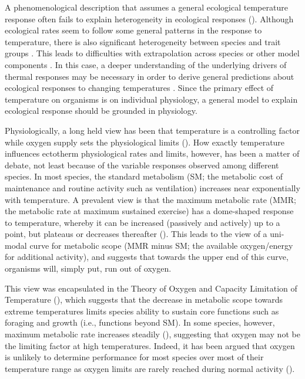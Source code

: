 \documentclass[11pt]{article}\usepackage[]{graphicx}\usepackage[]{color,soul}
\begin{document}
A phenomenological description that assumes a general ecological temperature response often fails to explain heterogeneity in ecological responses (\citealt{angilletta_temperature_2004,rall_universal_2012}). Although ecological rates seem to follow some general patterns in the response to temperature, there is also significant heterogeneity between species and trait groups \cite[e.g., ][]{angilletta_temperature_2004,englund_temperature_2011,rall_universal_2012}. This leads to difficulties with extrapolation across species or other model components \cite[e.g., fish in marine ecosystem models; ][]{guiet_effects_2016}. In this case, a deeper understanding of the underlying drivers of thermal responses may be necessary in order to derive general predictions about ecological responses to changing temperatures \cite[e.g., ][]{vucic-pestic_warming_2011,lefevre_models_2017}. Since the primary effect of temperature on organisms is on individual physiology, a general model to explain ecological response should be grounded in physiology.

Physiologically, a long held view has been that temperature is a controlling factor while oxygen supply sets the physiological limits (\citealt{fry_effects_1947,claireaux_linking_2007,lefevre_are_2016}). How exactly temperature influences ectotherm physiological rates and limits, however, has been a matter of debate, not least because of the variable responses observed among different species. In most species, the standard metabolism (SM; the metabolic cost of maintenance and routine activity such as ventilation) increases near exponentially with temperature. A prevalent view is that the maximum metabolic rate (MMR; the metabolic rate at maximum sustained exercise) has a dome-shaped response to temperature, whereby it can be increased (passively and actively) up to a point, but plateaus or decreases thereafter (\citealt{fry_effects_1947,claireaux_linking_2007,lefevre_are_2016,portner_physiology_2008}). This leads to the view of a uni-modal curve for metabolic scope (MMR minus SM; the available oxygen/energy for additional activity), and suggests that towards the upper end of this curve, organisms will, simply put, run out of oxygen. 

This view was encapsulated in the Theory of Oxygen and Capacity Limitation of Temperature (\citealt{portner_oxygen-and_2010}), which suggests that the decrease in metabolic scope towards extreme temperatures limits species ability to sustain core functions such as foraging and growth (i.e., functions beyond SM). In some species, however, maximum metabolic rate increases steadily (\citealt{lefevre_are_2016, verberk_does_2016}), suggesting that oxygen may not be the limiting factor at high temperatures. Indeed, it has been argued that oxygen is unlikely to determine performance for most species over most of their temperature range as oxygen limits are rarely reached during normal activity (\citealt{jutfelt_oxygen-and_2018, holt_climate_2015}). 
\end{document}
